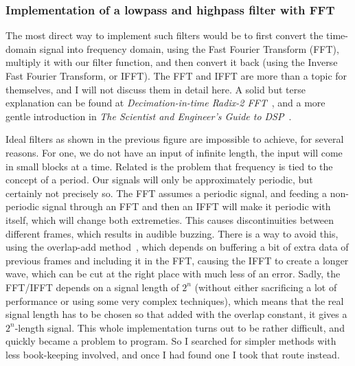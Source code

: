 \documentclass[11pt,a4paper]{article}
\begin{document}
\begin{figure}
\end{figure}

\subsubsection{Implementation of a lowpass and highpass filter with FFT}

The most direct way to implement such filters would be to first convert the time-domain signal into frequency domain, using the Fast Fourier Transform (FFT), multiply it with our filter function, and then convert it back (using the Inverse Fast Fourier Transform, or IFFT). The FFT and IFFT are more than a topic for themselves, and I will not discuss them in detail here. A solid but terse explanation can be found at \emph{Decimation-in-time Radix-2 FFT}~\cite{DITFFT}, and a more gentle introduction in \emph{The Scientist and Engineer's Guide to DSP}~\cite[chap. 12]{SmithDSP}.

Ideal filters as shown in the previous figure are impossible to achieve, for several reasons. For one, we do not have an input of infinite length, the input will come in small blocks at a time. Related is the problem that frequency is tied to the concept of a period. Our signals will only be approximately periodic, but certainly not precisely so. The FFT assumes a periodic signal, and feeding a non-periodic signal through an FFT and then an IFFT will make it periodic with itself, which will change both extremeties. This causes discontinuities between different frames, which results in audible buzzing. There is a way to avoid this, using the overlap-add method~\cite{Overlapadd}, which depends on buffering a bit of extra data of previous frames and including it in the FFT, causing the IFFT to create a longer wave, which can be cut at the right place with much less of an error.
Sadly, the FFT/IFFT depends on a signal length of $2^n$ (without either sacrificing a lot of performance or using some very complex techniques), which means that the real signal length has to be chosen so that added with the overlap constant, it gives a $2^n$-length signal. This whole implementation turns out to be rather difficult, and quickly became a problem to program. So I searched for simpler methods with less book-keeping involved, and once I had found one I took that route instead.
\end{document}
